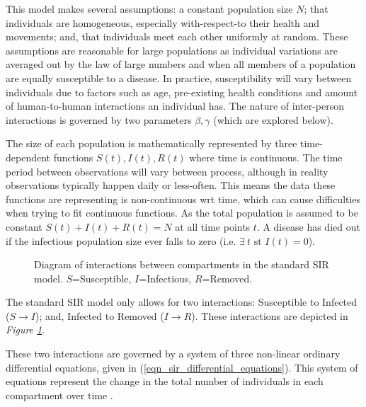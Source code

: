 \documentclass[11pt,a4paper]{article}
\theoremstyle{break}
\begin{document}
  \par This model makes several assumptions: a constant population size $N$; that individuals are homogeneous, especially with-respect-to their health and movements; and, that individuals meet each other uniformly at random. These assumptions are reasonable for large populations as individual variations are averaged out by the law of large numbers and when all members of a population are equally susceptible to a disease. In practice, susceptibility will vary between individuals due to factors such as age, pre-existing health conditions and amount of human-to-human interactions an individual has. The nature of inter-person interactions is governed by two parameters $\beta,\gamma$ (which are explored below).

  \par The size of each population is mathematically represented by three time-dependent functions $S(t),I(t),R(t)$ where time is continuous. The time period between observations will vary between process, although in reality observations typically happen daily or less-often. This means the data these functions are representing is non-continuous wrt time, which can cause difficulties when trying to fit continuous functions. As the total population is assumed to be constant $S(t)+I(t)+R(t)=N$ at all time points $t$. A disease has died out if the infectious population size ever falls to zero (i.e. $\exists\ t\text{ st }I(t)=0$).

  \begin{figure}[H]
    \centering
    \caption{Diagram of interactions between compartments in the standard SIR model. $S$=Susceptible, $I$=Infectious, $R$=Removed.}
    \label{fig_sir_model_diagram}
  \end{figure}

  \par The standard SIR model only allows for two interactions: Susceptible to Infected ($S\to I$); and, Infected to Removed ($I\to R$). These interactions are depicted in \textit{Figure \ref{fig_sir_model_diagram}}.

  \par These two interactions are governed by a system of three non-linear ordinary differential equations, given in (\ref{eqn_sir_differential_equations}). This system of equations represent the change in the total number of individuals in each compartment over time \cite[]{application_of_sir_epidemiological_model}.
\end{document}
